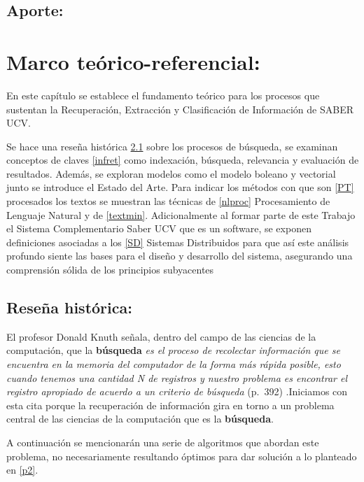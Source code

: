 \documentclass[
  10,
  openany]{book}
\begin{document}
\hypertarget{aporte}{%
\section{Aporte:}\label{aporte}}

\hypertarget{teorico}{%
\chapter{Marco teórico-referencial:}\label{teorico}}

En este capítulo se establece el fundamento teórico para los procesos que sustentan la Recuperación, Extracción y Clasificación de Información de SABER UCV.

Se hace una reseña histórica \ref{alghist} sobre los procesos de búsqueda, se examinan conceptos de claves \ref{infret} como indexación, búsqueda, relevancia y evaluación de resultados. Además, se exploran modelos como el modelo boleano y vectorial junto se introduce el Estado del Arte. Para indicar los métodos con que son \ref{PT} procesados los textos se muestran las técnicas de \ref{nlproc} Procesamiento de Lenguaje Natural y de \ref{textmin}. Adicionalmente al formar parte de este Trabajo el Sistema Complementario Saber UCV que es un software, se exponen definiciones asociadas a los \ref{SD} Sistemas Distribuidos para que así este análisis profundo siente las bases para el diseño y desarrollo del sistema, asegurando una comprensión sólida de los principios subyacentes

\hypertarget{alghist}{%
\section{Reseña histórica:}\label{alghist}}

El profesor Donald Knuth señala, dentro del campo de las ciencias de la computación, que la \textbf{búsqueda} \emph{es el proceso de recolectar información que se encuentra en la memoria del computador de la forma más rápida posible, esto cuando tenemos una cantidad N de registros y nuestro problema es encontrar el registro apropiado de acuerdo a un criterio de búsqueda} \citep{knuth1997} (p.~392) .Iniciamos con esta cita porque la recuperación de información gira en torno a un problema central de las ciencias de la computación que es la \textbf{búsqueda}.

A continuación se mencionarán una serie de algoritmos que abordan este problema, no necesariamente resultando óptimos para dar solución a lo planteado en \ref{p2}.
\end{document}
